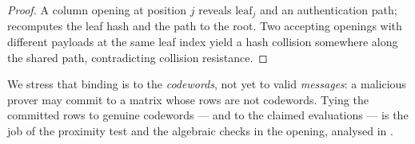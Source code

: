 \begin{proof}
A column opening at position $j$ reveals $\mathrm{leaf}_j$ and an
authentication path;  recomputes the leaf hash and
the path to the root. Two accepting openings with different payloads at
the same leaf index yield a hash collision somewhere along the shared
path, contradicting collision resistance.
\end{proof}

We stress that binding is to the \emph{codewords}, not yet to valid
\emph{messages}: a malicious prover may commit to a matrix whose rows are
not codewords. Tying the committed rows to genuine codewords --- and to
the claimed evaluations --- is the job of the proximity test and the
algebraic checks in the opening, analysed in .
